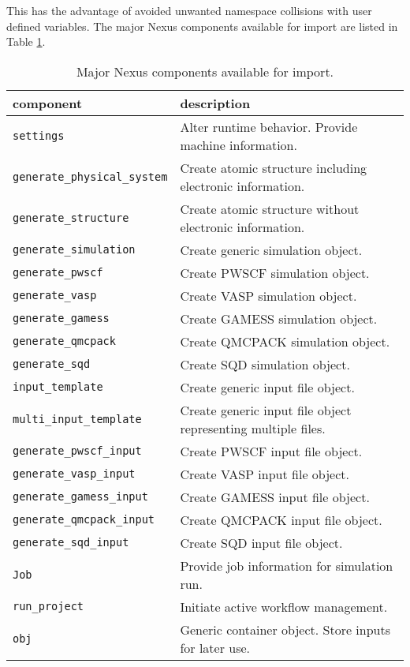\documentclass[oneside,11pt]{memoir}
\numberwithin{equation}{section}
\begin{document}
\noindent
This has the advantage of avoided unwanted namespace collisions with user defined variables.
The major Nexus components available for import are listed in Table \ref{tab:imports}.

\FloatBarrier
\begin{table}[h]
\begin{center}
\begin{tabularx}{\textwidth}{l l}
   \hline
   \bfseries component                 & \bfseries description \\
   \hline
   \texttt{settings}                   & Alter runtime behavior.  Provide machine information.    \\
   \texttt{generate\_physical\_system} & Create atomic structure including electronic information.  \\
   \texttt{generate\_structure}        & Create atomic structure without electronic information.    \\
   \texttt{generate\_simulation}       & Create generic simulation object.    \\
   \texttt{generate\_pwscf}            & Create PWSCF simulation object.    \\
   \texttt{generate\_vasp}             & Create VASP simulation object.    \\
   \texttt{generate\_gamess}           & Create GAMESS simulation object.    \\
   \texttt{generate\_qmcpack}          & Create QMCPACK simulation object.    \\
   \texttt{generate\_sqd}              & Create SQD simulation object.    \\
   \texttt{input\_template}            & Create generic input file object. \\
   \texttt{multi\_input\_template}     & Create generic input file object representing multiple files.\\
   \texttt{generate\_pwscf\_input}     & Create PWSCF input file object.    \\
   \texttt{generate\_vasp\_input}      & Create VASP input file object.    \\
   \texttt{generate\_gamess\_input}    & Create GAMESS input file object.    \\
   \texttt{generate\_qmcpack\_input}   & Create QMCPACK input file object.    \\
   \texttt{generate\_sqd\_input}       & Create SQD input file object.    \\
   \texttt{Job}                        & Provide job information for simulation run.    \\
   \texttt{run\_project}               & Initiate active workflow management.     \\
   \texttt{obj}                        & Generic container object.  Store inputs for later use.  \\
  \hline
\end{tabularx}
\end{center}
\caption{Major Nexus components available for import.\label{tab:imports}}
\end{table}
\FloatBarrier
\end{document}
